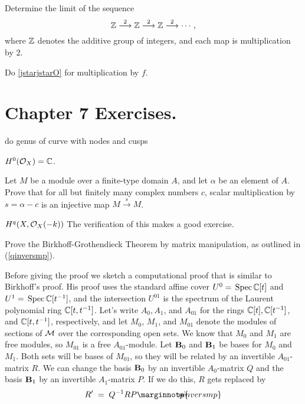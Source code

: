 \documentclass[leqno]{book}
\newcommand\Marginnote[1]{\marginnote{\hspace{-12pt}\normalfont{#1}}}
\theoremstyle{definition}%
\numberwithin{equation}{section}
\theoremstyle{theorem} %
\begin{document}
\bs
Determine the limit of the sequence  
$$\mathbb{Z} \stackrel{2}\longrightarrow \mathbb{Z} \stackrel{2}\longrightarrow
\mathbb{Z} \stackrel{2}\longrightarrow \cdots,$$ where $\mathbb{Z}$ denotes the
additive group of integers, and each map is multiplication by $2$.


\bs Do \ref{jstarjstarO}     for multiplication by $f$.


\newpage

\section{\bf Chapter 7  Exercises.}
\Marginnote{exerchapseven}\label{exerchapseven}

\bs
do genus of curve with nodes and cusps

\bs
 $ H^0(\co_X) = \bbc$.



\bs
Let $M$ be a module over a finite-type domain $A$, and let $\alpha$
be an element of $A$.  Prove that for all but finitely many complex numbers
$c$, scalar multiplication by $s = \alpha-c$ is an injective map $M
\stackrel{s}{\longrightarrow} M$.  

\bs
$H^q(X,{\co}_X(-k))$ The verification of this
makes a good exercise.

\msno  Prove the Birkhoff-Grothendieck Theorem by matrix
manipulation, as outlined in (\ref{qinversmp}).

Before giving the proof we sketch a computational proof that is
similar to Birkhoff's proof.  His proof uses the standard affine cover
$U^0=\,\operatorname{Spec} \mathbb{C}[t]$ and $U^1 = \,\operatorname{Spec} \mathbb{C}[t^{-1}]$, and the
intersection $U^{01}$ is the spectrum of the Laurent polynomial ring
$\mathbb{C}[t,t^{-1}]$.  Let's write $A_0,A_1$, and $A_{01}$ for the rings
$\mathbb{C}[t],\mathbb{C}[t^{-1}]$, and $\mathbb{C}[t,t^{-1}]$, respectively, and let
$M_0$, $M_1$, and $M_{01}$ denote the modules of sections of ${\cm}$
over the corresponding open sets.  We know that $M_0$ and $M_1$ are
free modules, so $M_{01}$ is a free $A_{01}$-module.  Let $\text{\bf
  B}_0$ and $\text{{\bf B}}_1$ be bases for $M_0$ and $M_1$.  Both
sets will be bases of $M_{01}$, so they will be related by an
invertible $A_{01}$-matrix $R$.  We can change the basis $\text{{\bf
    B}}_0$ by an invertible $A_0$-matrix $Q$ and the basis $\text{{\bf
    B}}_1$ by an invertible $A_1$-matrix $P$.  If we do this, $R$ gets
replaced by
\begin{equation}
R'\; =\; Q^{-1}RP \Marginnote{qinversmp} 
	\label{qinversmp}
\end{equation}
\end{document}
